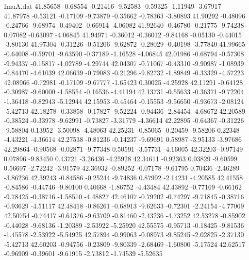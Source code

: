 \begin{filecontents}{ImuA.dat}
  41.85658   -0.68554   -0.21416   -9.52583   -0.59325   -1.11949   -3.67917
  41.87978   -0.53121   -0.17109   -9.73879   -0.35662   -0.78363   -3.80893
  41.90292   -0.48096   -0.24766   -9.68974   -0.49402   -0.66914   -4.06082
  41.92640   -0.46780   -0.21775   -9.74238    0.07082   -0.63097   -4.06845
  41.94971   -0.36012   -0.36012   -9.84168   -0.05130   -0.44015   -3.80130
  41.97304   -0.31226   -0.51206   -9.62872   -0.28029   -0.40198   -3.77840
  41.99665   -0.64008   -0.59701   -9.63590   -0.37189   -1.16528   -4.06845
  42.01986   -0.68794   -0.57308   -9.94337   -0.15817   -1.02789   -4.29744
  42.04307   -0.71067   -0.43310   -9.90987   -1.08939   -0.84470   -4.61039
  42.06639   -0.79083   -0.21296   -9.82732   -1.89849   -0.33329   -4.57223
  42.08966   -0.72981   -0.17109   -9.67777   -1.65423    0.30025   -4.25928
  42.11291   -0.64128   -0.30987   -9.60000   -1.58554   -0.16536   -4.41194
  42.13731   -0.55633   -0.36371   -9.72204   -1.36418   -0.82943   -5.12944
  42.15953   -0.45464   -0.15553   -9.56650   -0.93673   -2.08124   -5.42713
  42.18278   -0.33858   -0.17827   -9.52224   -0.94436   -2.84454   -4.68672
  42.20589   -0.38524   -0.33978   -9.62991   -0.73827   -3.31779   -4.36614
  42.22895   -0.64367   -0.31226   -9.58804    0.13952   -3.50098   -4.48063
  42.25231   -0.85065   -0.20459   -9.58206    0.22348   -4.43221   -4.36614
  42.27538   -0.81236   -0.14237   -9.69691    0.58987   -3.95133   -3.97686
  42.29864   -0.90568   -0.02871   -9.77348    0.50591   -3.57731   -4.16005
  42.32203   -0.97149    0.07896   -9.83450    0.43721   -3.26436   -4.25928
  42.34611   -0.92363    0.03829   -9.60599    0.56697   -2.72242   -3.91579
  42.36932   -0.89252   -0.07178   -9.61795    0.70436   -2.46289   -3.86236
  42.39243   -0.84586   -0.25244   -9.74836    0.87992   -2.14231   -4.20585
  42.41558   -0.84586   -0.44746   -9.80100    0.40668   -1.86752   -4.43484
  42.43892   -0.77169   -0.66162   -9.78425   -0.38716   -1.58510   -4.48827
  42.46107   -0.79202   -0.74297   -9.71845   -0.38716   -0.93629   -4.51117
  42.48418   -0.86261   -0.68913   -9.62633   -0.72301   -2.24154   -4.77069
  42.50754   -0.74417   -0.61376   -9.63709   -0.81460   -2.43236   -4.73252
  42.53278   -0.85902   -0.44028   -9.68136   -1.20389   -2.53922   -5.25920
  42.55575   -0.95713   -0.18425   -9.81536   -1.45578   -2.53922   -5.54925
  42.57894   -0.99063   -0.08973   -9.85245   -2.02825   -2.37130   -5.42713
  42.60203   -0.94756   -0.23809   -9.80339   -2.68469   -1.60800   -5.17524
  42.62517   -0.96909   -0.39601   -9.61915   -2.73812   -1.74539   -5.52635

\end{filecontents}
